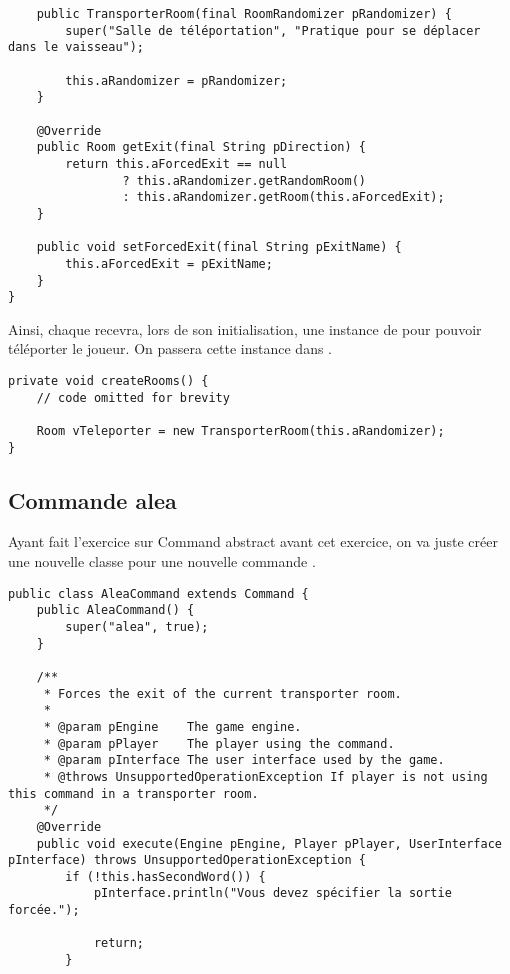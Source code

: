 \begin{exercise}[subtitle=Transporter]
\begin{verbatim}
    public TransporterRoom(final RoomRandomizer pRandomizer) {
        super("Salle de téléportation", "Pratique pour se déplacer dans le vaisseau");

        this.aRandomizer = pRandomizer;
    }

    @Override
    public Room getExit(final String pDirection) {
        return this.aForcedExit == null
                ? this.aRandomizer.getRandomRoom()
                : this.aRandomizer.getRoom(this.aForcedExit);
    }

    public void setForcedExit(final String pExitName) {
        this.aForcedExit = pExitName;
    }
}
\end{verbatim}

Ainsi, chaque  recevra, lors de son initialisation, une instance de  pour pouvoir téléporter le joueur. On passera cette instance dans .

\begin{verbatim}
private void createRooms() {
    // code omitted for brevity

    Room vTeleporter = new TransporterRoom(this.aRandomizer);
}
\end{verbatim}

\subsection*{Commande alea}

Ayant fait l'exercice sur Command abstract avant cet exercice, on va juste créer une nouvelle classe pour une nouvelle commande .

\begin{verbatim}
public class AleaCommand extends Command {
    public AleaCommand() {
        super("alea", true);
    }

    /**
     * Forces the exit of the current transporter room.
     *
     * @param pEngine    The game engine.
     * @param pPlayer    The player using the command.
     * @param pInterface The user interface used by the game.
     * @throws UnsupportedOperationException If player is not using this command in a transporter room.
     */
    @Override
    public void execute(Engine pEngine, Player pPlayer, UserInterface pInterface) throws UnsupportedOperationException {
        if (!this.hasSecondWord()) {
            pInterface.println("Vous devez spécifier la sortie forcée.");

            return;
        }


\end{verbatim}
\end{exercise}
